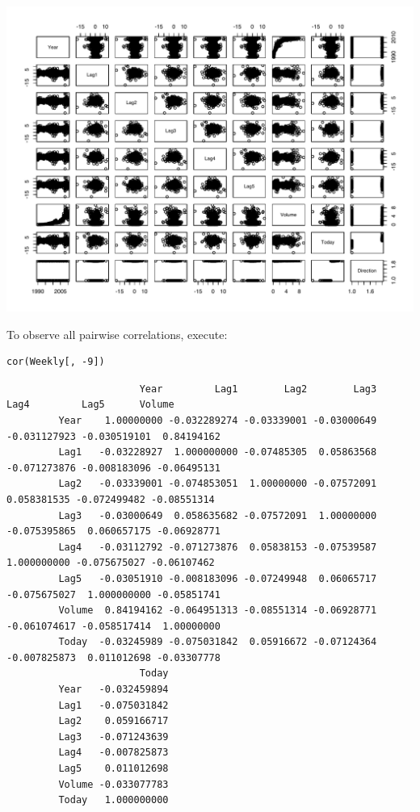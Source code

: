 \documentclass[twoside,11pt]{homework}
\begin{document}
\begin{enumerate}
		\begin{center}
		  \includegraphics[height=0.5\textheight]{f1.pdf}
		\end{center}
		
		To observe all pairwise correlations, execute:
		
		\begin{lstlisting}
cor(Weekly[, -9])
		\end{lstlisting}
		
		\begin{verbatim}
		               Year         Lag1        Lag2        Lag3         Lag4         Lag5      Volume
		 Year    1.00000000 -0.032289274 -0.03339001 -0.03000649 -0.031127923 -0.030519101  0.84194162
		 Lag1   -0.03228927  1.000000000 -0.07485305  0.05863568 -0.071273876 -0.008183096 -0.06495131
		 Lag2   -0.03339001 -0.074853051  1.00000000 -0.07572091  0.058381535 -0.072499482 -0.08551314
		 Lag3   -0.03000649  0.058635682 -0.07572091  1.00000000 -0.075395865  0.060657175 -0.06928771
		 Lag4   -0.03112792 -0.071273876  0.05838153 -0.07539587  1.000000000 -0.075675027 -0.06107462
		 Lag5   -0.03051910 -0.008183096 -0.07249948  0.06065717 -0.075675027  1.000000000 -0.05851741
		 Volume  0.84194162 -0.064951313 -0.08551314 -0.06928771 -0.061074617 -0.058517414  1.00000000
		 Today  -0.03245989 -0.075031842  0.05916672 -0.07124364 -0.007825873  0.011012698 -0.03307778
		               Today
		 Year   -0.032459894
		 Lag1   -0.075031842
		 Lag2    0.059166717
		 Lag3   -0.071243639
		 Lag4   -0.007825873
		 Lag5    0.011012698
		 Volume -0.033077783
		 Today   1.000000000
		
		\end{verbatim}
		

\end{enumerate}
\end{document}
